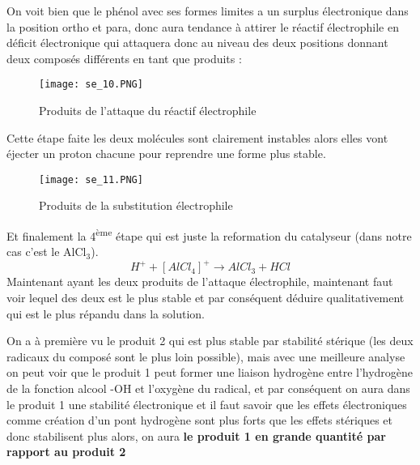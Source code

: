 \documentclass[a4paper, oneside]{book}
\begin{document}
On voit bien que le phénol avec ses formes limites a un surplus électronique dans la position ortho et para, donc aura tendance à attirer le réactif électrophile en déficit électronique qui attaquera donc au niveau des deux positions donnant deux composés différents en tant que produits :
\begin{figure}[!h]
    \centering
    \texttt{[image: se\_10.PNG]}
    \caption{Produits de l'attaque du réactif électrophile}
    \label{fig:my_label}
\end{figure}

Cette étape faite les deux molécules sont clairement instables alors elles vont éjecter un proton chacune pour reprendre une forme plus stable.
\begin{figure}[!h]
    \centering
    \texttt{[image: se\_11.PNG]}
    \caption{Produits de la substitution électrophile}
    \label{fig:my_label}
\end{figure}

Et finalement la 4\textsuperscript{ème} étape qui est juste la reformation du catalyseur (dans notre cas c'est le AlCl$_3$).
\[
    H^+ + [AlCl_4]^+ \longrightarrow AlCl_3 + HCl
\]
Maintenant ayant les deux produits de l'attaque électrophile, maintenant faut voir lequel des deux est le plus stable et par conséquent déduire qualitativement qui est le plus répandu dans la solution.

On a à première vu le produit 2 qui est plus stable par stabilité stérique (les deux radicaux du composé sont le plus loin possible), mais avec une meilleure analyse on peut voir que le produit 1 peut former une liaison hydrogène entre l'hydrogène de la fonction alcool -OH et l'oxygène du radical, et par conséquent on aura dans le produit 1 une stabilité électronique et il faut savoir que les effets électroniques comme création d'un pont hydrogène sont plus forts que les effets stériques et donc stabilisent plus alors, on aura \textbf{le produit 1 en grande quantité par rapport au produit 2}
\end{document}
